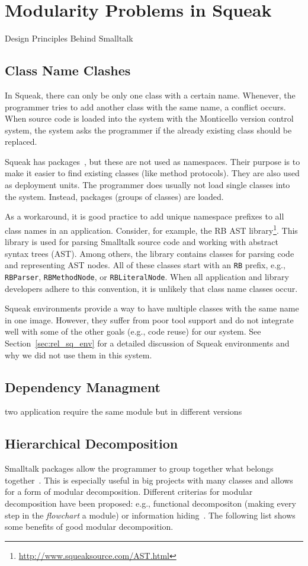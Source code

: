 \chapter{Modularity Problems in Squeak}
Design Principles Behind Smalltalk

\section{Class Name Clashes}
In Squeak, there can only be only one class with a certain name. Whenever, the programmer tries to add another class with the same name, a conflict occurs. When source code is loaded into the system with the Monticello version control system, the system asks the programmer if the already existing class should be replaced.

Squeak has packages~\cite{Nierstrasz:2009:SE:1816759}, but these are not used as namespaces. Their purpose is to make it easier to find existing classes (like method protocols). They are also used as deployment units. The programmer does usually not load single classes into the system. Instead, packages (groups of classes) are loaded.

As a workaround, it is good practice to add unique namespace prefixes to all class names in an application. Consider, for example, the RB AST library\footnote{\url{http://www.squeaksource.com/AST.html}}. This library is used for parsing Smalltalk source code and working with abstract syntax trees (AST). Among others, the library contains classes for parsing code and representing AST nodes. All of these classes start with an \texttt{RB} prefix, e.g., \texttt{RBParser}, \texttt{RBMethodNode}, or \texttt{RBLiteralNode}. When all application and library developers adhere to this convention, it is unlikely that class name classes occur.

Squeak environments provide a way to have multiple classes with the same name in one image. However, they suffer from poor tool support and do not integrate well with some of the other goals (e.g., code reuse) for our system. See Section~\ref{sec:rel_sq_env} for a detailed discussion of Squeak environments and why we did not use them in this system.

\section{Dependency Managment}
two application require the same module but in different versions

\section{Hierarchical Decomposition}
Smalltalk packages allow the programmer to group together what belongs together~\cite{Eckel:2002:TJ:579108}. This is especially useful in big projects with many classes and allows for a form of modular decomposition. Different criterias for modular decomposition have been proposed: e.g., functional decompositon (making every step in the \emph{flowchart} a module) or information hiding~\cite{Parnas:1972:CUD:361598.361623}. The following list shows some benefits of good modular decomposition.

